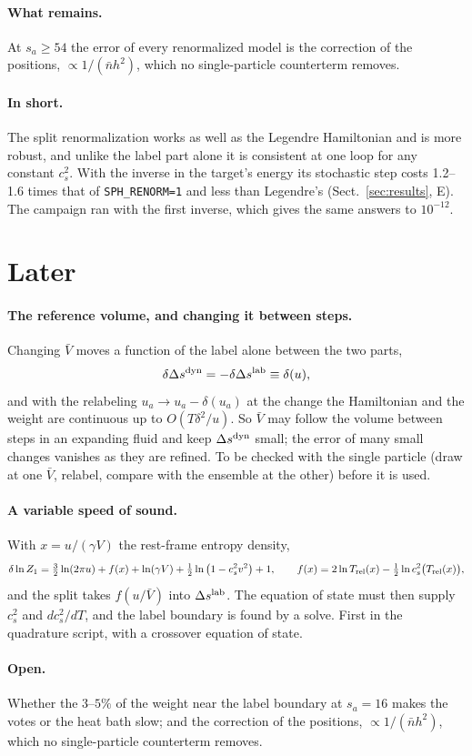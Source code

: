 \documentclass[11pt,aps,preprint,nofootinbib,superscriptaddress,tightenlines]{revtex4-2}
\def\st{\begin{equation}}
\def\stp{\end{equation}}
\def\Sect#1{Sect.~\ref{#1}}
\let\oldparagraph\paragraph
\renewcommand{\paragraph}{\par\bigskip\oldparagraph}
\begin{document}
\paragraph{What remains.}  At $s_a\ge54$ the error of every renormalized model is the correction of the positions, $\propto1/(\bar nh^2)$, which no
single-particle counterterm removes.

\paragraph{In short.}  The split renormalization works as well as the Legendre Hamiltonian and is more robust, and unlike the label part alone it is
consistent at one loop for any constant $c_s^2$.  With the inverse in the target's energy its stochastic step costs 1.2--1.6 times that of
\texttt{SPH\_RENORM=1} and less than Legendre's (\Sect{sec:results}, E).  The campaign ran with the first inverse, which gives the same answers to
$10^{-12}$.

\section{Later}
\label{sec:later}

\paragraph{The reference volume, and changing it between steps.}  Changing $\bar V$ moves a function of the label alone between the two parts,
\st
\delta\Delta s^{\rm dyn}=-\delta\Delta s^{\rm lab}\equiv\delta(u) ,
\stp
and with the relabeling $u_a\to u_a-\delta(u_a)$ at the change the Hamiltonian and the weight are continuous up to $O(T\delta^2/u)$.  So $\bar V$ may follow the
volume between steps in an expanding fluid and keep $\Delta s^{\rm dyn}$ small; the error of many small changes vanishes as they are refined.  To be checked with the
single particle (draw at one $\bar V$, relabel, compare with the ensemble at the other) before it is used.

\paragraph{A variable speed of sound.}  With $x=u/(\gamma V)$ the rest-frame entropy density,
\st
\delta\ln Z_1=\tfrac32\ln(2\pi u)+f(x)+\ln(\gamma V)+\tfrac12\ln\big(1-c_s^2v^2\big)+1,\qquad f(x)=2\ln T_{\rm rel}(x)-\tfrac12\ln c_s^2\big(T_{\rm rel}(x)\big),
\stp
and the split takes $f(u/\bar V)$ into $\Delta s^{\rm lab}$.  The equation of state must then supply $c_s^2$ and $dc_s^2/dT$, and the label boundary is found by a
solve.  First in the quadrature script, with a crossover equation of state.

\paragraph{Open.}  Whether the $3$--$5\%$ of the weight near the label boundary at $s_a=16$ makes the votes or the heat bath slow; and the correction of the
positions, $\propto1/(\bar nh^2)$, which no single-particle counterterm removes.
\end{document}
